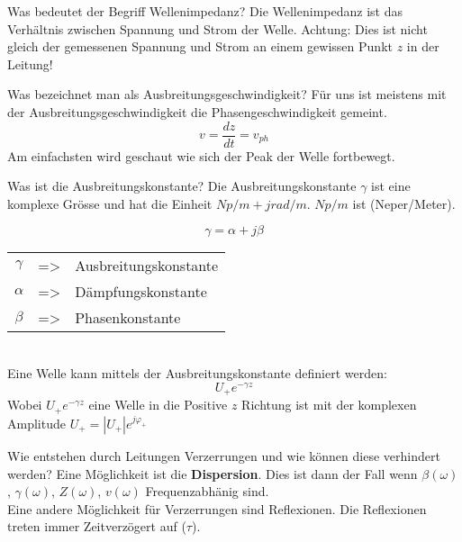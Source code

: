 \begin{karte}{Was bedeutet der Begriff Wellenimpedanz?}
	Die Wellenimpedanz ist das Verhältnis zwischen Spannung und Strom der Welle. Achtung: Dies ist nicht gleich der gemessenen Spannung und Strom an einem gewissen Punkt $z$ in der Leitung!\\[5pt]
	 
\end{karte}

\begin{karte}{Was bezeichnet man als Ausbreitungsgeschwindigkeit?}
	Für uns ist meistens mit der Ausbreitungsgeschwindigkeit die Phasengeschwindigkeit gemeint.
	\begin{equation*}
		v = \frac{dz}{dt} = v_{ph} 
	\end{equation*}
	Am einfachsten wird geschaut wie sich der Peak der Welle fortbewegt.
	\vspace{-10pt}
	\begin{figure}[h]
		\centering
		
	\end{figure}
\end{karte}

\begin{karte}{Was ist die Ausbreitungskonstante?}
	Die Ausbreitungskonstante $\gamma$ ist eine komplexe Grösse und hat die Einheit $Np/m + jrad/m$. $Np/m$ ist (Neper/Meter).\\[7pt]
	\begin{minipage}[c]{0.38\textwidth}
		\begin{equation*}
		\gamma = \alpha + j \beta
		\end{equation*}
	\end{minipage}
	\begin{minipage}[t]{0.68\textwidth}
		\begin{tabular}{ccl}
			$\gamma$ & => & Ausbreitungskonstante\\
			$\alpha$ & => & Dämpfungskonstante\\
			$\beta$  & => & Phasenkonstante
		\end{tabular}
	\end{minipage}\\[7pt]
	
	Eine Welle kann mittels der Ausbreitungskonstante definiert werden:
	\begin{equation*}
		U_+ e^{-\gamma z}
	\end{equation*}
	Wobei $U_+ e^{-\gamma z}$ eine Welle in die Positive $z$ Richtung ist mit der komplexen Amplitude $U_+=|U_+| e^{j \varphi_+}$
\end{karte}

\begin{karte}{Wie entstehen durch Leitungen Verzerrungen und wie können diese verhindert werden?}
	Eine Möglichkeit ist die \textbf{Dispersion}. Dies ist dann der Fall wenn $\beta(\omega)$, $\gamma(\omega)$, $Z(\omega)$, $v(\omega)$ Frequenzabhänig sind.\\
	Eine andere Möglichkeit für Verzerrungen sind Reflexionen. Die Reflexionen treten immer Zeitverzögert auf ($\tau$).\\
	\scalebox{.8}{}
\end{karte}
